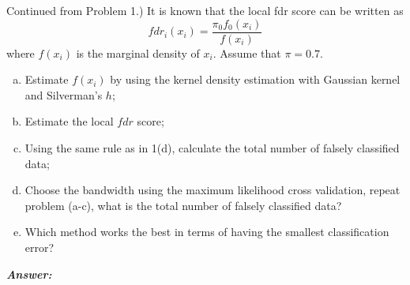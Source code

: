\documentclass[12pt]{article}
\newenvironment{question}[2][Question]{\begin{trivlist}
\item[\hskip \labelsep {\bfseries #1}\hskip \labelsep {\bfseries #2.}]}{\end{trivlist}}
\begin{document}
\bigskip
\bigskip
 \begin{question}{5.2} (Continued from Problem 1.)  It is known that the local fdr score can be written as 
$$
fdr_i(x_i) = \frac{\pi_0 f_0(x_i)} {f(x_i)}
$$
where $f(x_i)$ is the marginal density of $x_i$. Assume that $\pi = 0.7$.
 \begin{enumerate}[(a)]
\item Estimate $f(x_i)$ by using the kernel density estimation with Gaussian kernel and Silverman's $h$;
\item Estimate the local $fdr$ score;
\item  Using the same rule as in 1(d), calculate the total number of falsely classified data;
\item Choose the bandwidth using the maximum likelihood cross validation, repeat problem (a-c),
what is the total number of falsely classified data?
\item Which method works the best in terms of having the smallest classification error?
\end{enumerate}
\end{question} 


  \textbf{\color{TealBlue}\emph{Answer:} } 
 
 
 
\end{document}

